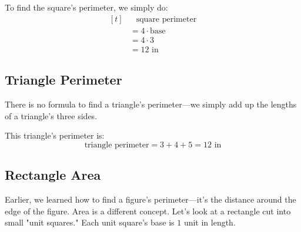 \begin{center}
\label{fig: squPerimeter}
\end{center}

To find the square's perimeter, we simply do:
\[ 
\begin{aligned}[t]
	&\phantom{{}=}\text{square perimeter} \\
	&= 4 \cdot \text{base} \\
	&=4\cdot3 \\
	&=12 \text{ in} 
\end{aligned}
\]

\subsection{Triangle Perimeter}
There is no formula to find a triangle's perimeter---we simply add up the lengths of a triangle's three sides.

\begin{center}
\label{fig: triPerimeter}
\end{center}

This triangle's perimeter is:
\[ \text{triangle perimeter} = 3+4+5 = 12 \text{ in} \]

\subsection{Rectangle Area}
Earlier, we learned how to find a figure's perimeter---it's the distance around the edge of the figure. Area is a different concept. Let's look at a rectangle cut into small "unit squares." Each unit square's base is $1$ unit in length.

\begin{tightcenter}
   \label{fig: recSquare}
\end{tightcenter}

